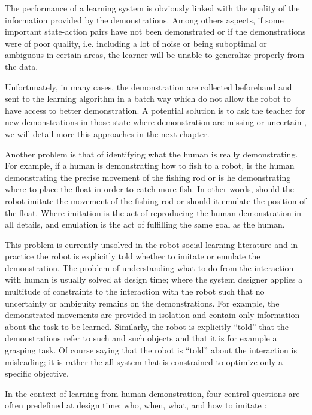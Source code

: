 The performance of a learning system is obviously linked with the quality of the information provided by the demonstrations. Among others aspects, if some important state-action pairs have not been demonstrated or if the demonstrations were of poor quality, i.e. including a lot of noise or being suboptimal or ambiguous in certain areas, the learner will be unable to generalize properly from the data. 

Unfortunately, in many cases, the demonstration are collected beforehand and sent to the learning algorithm in a batch way which do not allow the robot to have access to better demonstration. A potential solution is to ask the teacher for new demonstrations in those state where demonstration are missing or uncertain \cite{chernova2008multi,chernova09jair}, we will detail more this approaches in the next chapter.

Another problem is that of identifying what the human is really demonstrating. For example, if a human is demonstrating how to fish to a robot, is the human demonstrating the precise movement of the fishing rod or is he demonstrating where to place the float in order to catch more fish. In other words, should the robot imitate the movement of the fishing rod or should it emulate the position of the float. Where imitation is the act of reproducing the human demonstration in all details, and emulation is the act of fulfilling the same goal as the human.

This problem is currently unsolved in the robot social learning literature and in practice the robot is explicitly told whether to imitate or emulate the demonstration. The problem of understanding what to do from the interaction with human is usually solved at design time; where the system designer applies a multitude of constraints to the interaction with the robot such that no uncertainty or ambiguity remains on the demonstrations. For example, the demonstrated movements are provided in isolation and contain only information about the task to be learned. Similarly, the robot is explicitly ``told'' that the demonstrations refer to such and such objects and that it is for example a grasping task. Of course saying that the robot is ``told'' about the interaction is misleading; it is rather the all system that is constrained to optimize only a specific objective.

In the context of learning from human demonstration, four central questions are often predefined at design time: who, when, what, and how to imitate \cite{nehaniv2000hummingbirds}:

